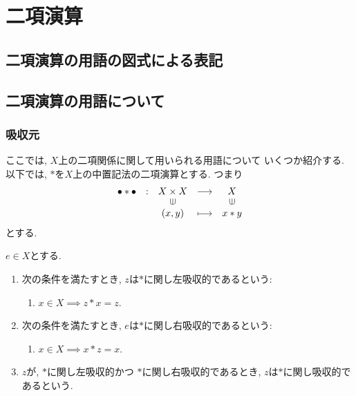 \chapter{二項演算}
\section{二項演算の用語の図式による表記}
\section{二項演算の用語について}
\subsection{吸収元}
ここでは, $X$上の二項関係に関して用いられる用語について
いくつか紹介する.
以下では,
$\ast$を$X$上の中置記法の二項演算とする.
つまり
\begin{align*}
  \shazo{\bullet\ast\bullet}
        {X\times X}{X}
        {(x,y)}{x\ast y}
\end{align*}
とする.
\begin{definition}
  $e\in X$とする.
  \begin{enumerate}
  \item
    次の条件を満たすとき,
    $z$は$\ast$に関し左吸収的であるという:
    \begin{enumerate}
    \item $x\in X\implies z\ast x=z$.
    \end{enumerate}
  \item
    次の条件を満たすとき,
    $e$は$\ast$に関し右吸収的であるという:
    \begin{enumerate}
    \item $x\in X\implies x\ast z=x$.
    \end{enumerate}
  \item
    $z$が,
    $\ast$に関し左吸収的かつ
    $\ast$に関し右吸収的であるとき,
    $z$は$\ast$に関し吸収的であるという.
  \end{enumerate}
\end{definition}

